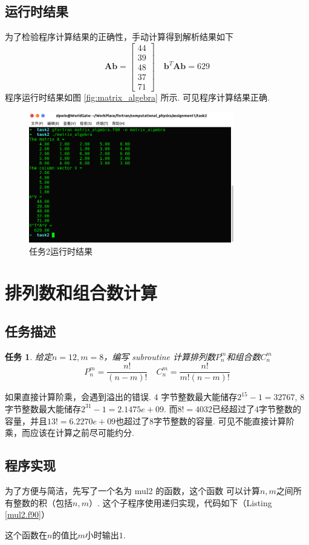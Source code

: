 \documentclass{article}
\newtheorem{task}{任务}
\begin{document}
	\subsection{运行时结果}
	为了检验程序计算结果的正确性，手动计算得到解析结果如下
	\[
	\bm{A}\bm{b}=
	\begin{bmatrix}
	44 \\
	39 \\
	48 \\
	37 \\
	71
	\end{bmatrix}
	\quad
	\bm{b}^T\bm{A}\bm{b}=629
	\]
	程序运行时结果如图 \ref{fig:matrix_algebra} 所示. 可见程序计算结果正确. 
	\begin{figure}[h!tb]
		\centering
		\includegraphics[width=0.8\textwidth]{./utils/rtr_matrix_algebra.png}
		\caption{ 任务2运行时结果\label{fig:rtr_matrix_algebra}}
	\end{figure}
	
	\section{排列数和组合数计算}
	\subsection{任务描述}
	\begin{task}
		给定$n=12, m=8$，编写 subroutine 计算排列数$P_n^m$和组合数$C_n^m$
		\[
		P_n^m=\frac{n!}{(n-m)!}\quad C_n^m=\frac{n!}{m!(n-m)!}
		\]
	\end{task}
	如果直接计算阶乘，会遇到溢出的错误. 4 字节整数最大能储存$2^15-1=32767$, 8 字节整数最大能储存$2^31-1=2.1475e+09$. 而$8!=4032$已经超过了4字节整数的容量，并且$13!=6.2270e+09$也超过了8字节整数的容量. 可见不能直接计算阶乘，而应该在计算之前尽可能约分.
	\subsection{程序实现}
	为了方便与简洁，先写了一个名为 mul2 的函数，这个函数 可以计算$n,m$之间所有整数的积（包括$n,m$）. 这个子程序使用递归实现，代码如下（Listing \ref{mul2.f90}）
	
	这个函数在$n$的值比$m$小时输出$1$.
	
\end{document}
